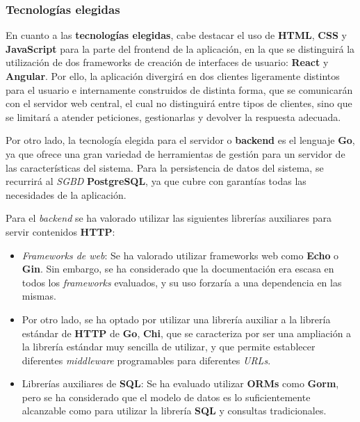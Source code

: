 \documentclass[11pt, a4paper, titlepage]{article}
\begin{document}
\subsubsection{Tecnologías elegidas}

En cuanto a las \textbf{tecnologías elegidas}, cabe destacar el uso de \textbf{HTML}, \textbf{CSS} y \textbf{JavaScript} para la parte del frontend de la aplicación, en la que se distinguirá la utilización de dos frameworks de creación de interfaces de usuario: \textbf{React} y \textbf{Angular}. Por ello, la aplicación divergirá en dos clientes ligeramente distintos para el usuario e internamente construidos de distinta forma, que se comunicarán con el servidor web central, el cual no distinguirá entre tipos de clientes, sino que se limitará a atender peticiones, gestionarlas y devolver la respuesta adecuada. \newline

Por otro lado, la tecnología elegida para el servidor o \textbf{backend} es el lenguaje \textbf{Go}, ya que ofrece una gran variedad de herramientas de gestión para un servidor de las características del sistema. Para la persistencia de datos del sistema, se recurrirá al \textit{SGBD} \textbf{PostgreSQL}, ya que cubre con garantías todas las necesidades de la aplicación. \newline

Para el \textit{backend} se ha valorado utilizar las siguientes librerías auxiliares para servir contenidos \textbf{HTTP}:


\begin{itemize}
    \item \textit{Frameworks de web}: Se ha valorado utilizar frameworks web como \textbf{Echo} o \textbf{Gin}. Sin embargo, se ha considerado que  la documentación era escasa en todos los \textit{frameworks} evaluados, y su uso forzaría a una dependencia en las mismas.

    \item Por otro lado, se ha optado por utilizar una librería auxiliar a la librería estándar de \textbf{HTTP} de \textbf{Go}, \textbf{Chi}, que se caracteriza por ser una ampliación a la librería estándar muy sencilla de utilizar, y que permite establecer diferentes \textit{middleware} programables para diferentes \textit{URLs}.

    \item Librerías auxiliares de \textbf{SQL}: Se ha evaluado utilizar \textbf{ORMs} como \textbf{Gorm}, pero se ha considerado que el modelo de datos es lo suficientemente alcanzable como para utilizar la librería \textbf{SQL} y consultas tradicionales.
\end{itemize}
\end{document}
